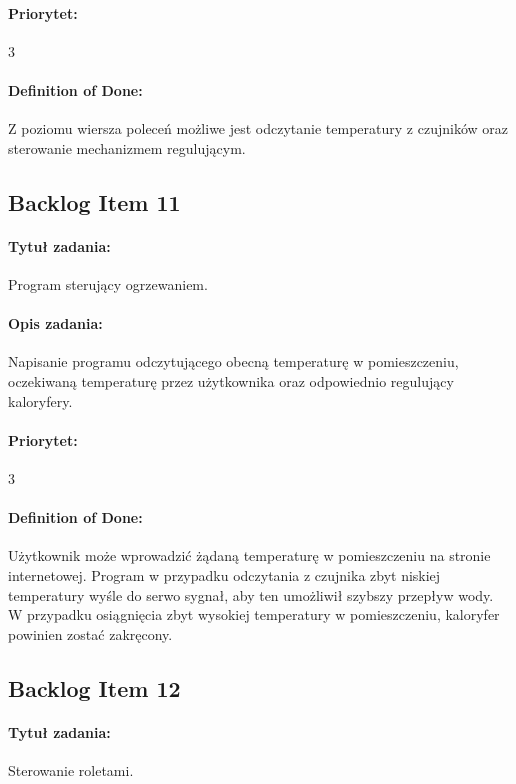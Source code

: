 	\paragraph{Priorytet:}
	3
	
	\paragraph{Definition of Done:} 
	Z poziomu wiersza poleceń możliwe jest odczytanie temperatury z czujników oraz sterowanie mechanizmem regulującym.
	


\subsection{Backlog Item 11}
\paragraph{Tytuł zadania:}
Program sterujący ogrzewaniem.

\paragraph{Opis zadania:} 
Napisanie programu odczytującego obecną temperaturę w pomieszczeniu, oczekiwaną temperaturę przez użytkownika oraz odpowiednio regulujący kaloryfery.

\paragraph{Priorytet:}
3

\paragraph{Definition of Done:} 
Użytkownik może wprowadzić żądaną temperaturę w pomieszczeniu na stronie internetowej. Program w przypadku odczytania z czujnika zbyt niskiej temperatury wyśle do serwo sygnał, aby ten umożliwił szybszy przepływ wody. W przypadku osiągnięcia zbyt wysokiej temperatury w pomieszczeniu, kaloryfer powinien zostać zakręcony. 


	
	\subsection{Backlog Item 12}
	\paragraph{Tytuł zadania:}
	Sterowanie roletami.
	
